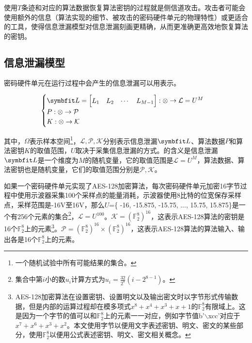 {	使用$T$条迹和对应的算法数据恢复算法密钥的过程就是侧信道攻击。攻击者可能会使用额外的信息（算法实现的细节、被攻击的密码硬件单元的物理特性）或更适合的工具，使得信息泄漏模型对信息泄漏刻画更精确，从而更准确更高效地恢复算法的密钥。
	
	\subsection{信息泄漏模型}
	
	密码硬件单元在运行过程中会产生的信息泄漏可以用表示。
	
	\begin{equation}
		\begin{cases}
			\Vector L=\begin{bmatrix}L_1&L_2&\cdots&L_{M-1}\end{bmatrix}:\mathcal \Omega\rightarrow \mathcal L=U^{M}\\
			P:\mathcal \Omega\rightarrow \mathcal P\\
			K:\mathcal \Omega\rightarrow \mathcal K
		\end{cases}\label{eq:leakagemodel}
	\end{equation}
	
	\noindent 其中，$\Omega$表示样本空间\footnote{一个随机试验中所有可能结果的集合。}，$\mathcal L,\mathcal P,\mathcal K$分别表示信息泄漏$\Vector L$、算法数据$P$和算法密钥$K$的取值范围，$U$取决于采集信息泄漏的方式。的含义是信息泄漏$\Vector L$是一个维度为$M$的随机变量，它的取值范围是$\mathcal L=U^M$，算法数据、算法密钥也是随机变量，它们的取值范围分别是$\mathcal P, \mathcal K$。
	
	\begin{example}
		如果一个密码硬件单元实现了AES-128加密算法，每次密码硬件单元加密16字节过程中使用示波器采集100个采样点的能量消耗，示波器使用8比特的位宽保存采样点，采样范围是-16V至16V，那么$U$=\{ -16, -15.875, -15.75, $\dots$, 15.75, 15.875\}是一个有256个元素的集合\footnote{集合中第$i$小的数$u_i$计算方式为$u_i=\frac{32}{2^8}(i-2^{8-1})$。}，$\mathcal L=U^{100}$。$\mathcal K=\left( {\mathbb F_2^8}\right) ^{16}$，这表示AES-128算法的密钥是16个$\mathbb F_2^8$上的元素\footnote{AES-128加密算法在设置密钥、设置明文以及输出密文时以字节形式传输数据，但是内部的运算过程却在模多项式$x^8+x^4+x^3+x+1$的$\mathbb F_2^8$有限域上。这是因为一个字节的值可以和$\mathbb F_2^8$上的元素一一对应，例如字节值b'$\backslash$xcc'对应于$x^7+x^6+x^3+x^2$。本文使用字节以便用文字表述密钥、明文、密文的某些部分，使用$\mathbb F_2^8$以便用公式表述密钥、明文、密文相关概念。}。$\mathcal P=\left( {\mathbb F_2^8}\right) ^{16}\times \left( {\mathbb F_2^8}\right) ^{16}$，这表示AES-128算法的算法输入、输出各是16个$\mathbb F_2^8$上的元素。
	\end{example}
	
}
